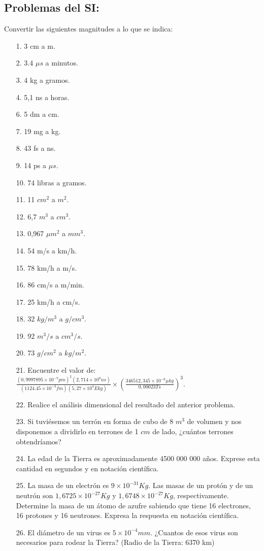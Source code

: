 \subsection{Problemas del SI:}

Convertir las siguientes magnitudes a lo que se indica:
\begin{itemize}
 \item[1.] 3 cm a m.
 \item[2.] 3.4 $\mu s$ a minutos.
 \item[3.] 4 kg a gramos.
 \item[4.] 5,1 ns a horas.
 \item[6.] 5 dm a cm.
 \item[7.] 19 mg a kg.
 \item[8.] 43 fs a ns.
 \item[9.] 14 ps a $\mu s$.
 \item[10.] 74 libras a gramos.
 \item[11.] 11 $cm^2$ a $m^2$.
 \item[12.] 6,7 $m^3$ a $cm^3$.
 \item[13.] 0,967 $\mu m^2$ a $mm^3$.
 \item[14.] 54 m/s a km/h.
 \item[15.] 78 km/h a m/s.
 \item[16.] 86 cm/s a m/min.
 \item[17.] 25 km/h a cm/s.
 \item[18.] 32 $kg/m^3$ a $g/cm^3$.
 \item[19.] 92 $m^3/s$ a $cm^3/s$.
 \item[20.] 73 $g/cm^2$ a $kg/m^2$.
 \item[21.] Encuentre el valor de:\\
 $\frac{(0,9997895\times 10^{-7}pm)^2(2,714\times 10^8 ns)}{(1124.45\times 10^{-3} fm)(5,27\times 10^4 Ekg)}\times 
\left(\frac{346512,345\times 10^{-6} \mu kg}{0,00023 Ts}\right)^3$.
 \item[22.] Realice el análisis dimensional del resultado del anterior problema.
\item[23.] Si tuviésemos un terrón en forma de cubo de 8 $m^3$ de volumen y nos disponemos a dividirlo en terrones de 1 $cm$ de 
lado, ¿cuántos terrones obtendríamos?
\item[24.] La edad de la Tierra es aproximadamente 4500 000 000 años. Exprese esta cantidad en segundos y en notación
científica.
\item[25.] La masa de un electrón es $9 \times 10
^{-31}Kg$. Las masas de un
 protón y de un neutrón son $1,6725 \times 10
^{
-27} Kg$ y $1,6748 \times 10
^{-27} Kg$, respectivamente.
 Determine la masa de un átomo de azufre sabiendo que tiene 16 
electrones, 16 protones y
 16 neutrones. Expresa la respuesta en notación científica.

\item[26.] El
 diámetro de un virus es $5 \times 10^{-4} mm$. ¿Cuantos de esos virus son necesarios para rodear
 la Tierra? 
(Radio de la Tierra: 6370 km) 

 \end{itemize}

